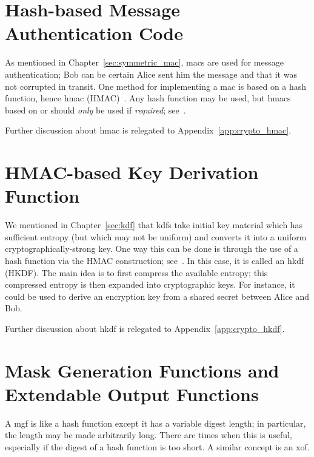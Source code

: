 


\section{Hash-based Message Authentication Code}
\label{sec:hash_hmac}

As mentioned in Chapter~\ref{sec:symmetric_mac},
\glspl{mac} are used for message authentication;
Bob can be certain Alice sent him the message and that it was not
corrupted in transit.
One method for implementing a \gls{mac} is based on a \gls{hash function},
hence \gls{hmac} (HMAC)~\cite{HMAC1996,rfc2104}.
Any \gls{hash function} may be used,
but \glspl{hmac} based on \MDFive{} or \ShaOne{} should \emph{only}
be used if \emph{required}; see~\cite{rfc6151}.

Further discussion about \gls{hmac} is relegated to
Appendix~\ref{app:crypto_hmac}.



\section{HMAC-based Key Derivation Function}
\label{sec:hash_hkdf}

We mentioned in Chapter~\ref{sec:kdf} that \glspl{kdf}
take initial key material which
has sufficient entropy (but which may not be uniform)
and converts it into a uniform cryptographically-strong key.
One way this can be done is through the use of a \gls{hash function}
via the HMAC construction; see~\cite{HKDF2010,rfc5869}.
In this case, it is called an \gls{hkdf} (HKDF).
The main idea is to first compress the available entropy;
this compressed entropy is then expanded into cryptographic keys.
For instance, it could be used to derive an encryption key
from a \gls{shared secret} between Alice and Bob.

Further discussion about \gls{hkdf} is relegated to
Appendix~\ref{app:crypto_hkdf}.



\section{Mask Generation Functions and Extendable Output Functions}
\label{sec:hash_mgf_xof}

A \gls{mgf} is like a \gls{hash function}
except it has a variable digest length;
in particular, the length may be made arbitrarily long.
There are times when this is useful, especially if the digest
of a \gls{hash function} is too short.
A similar concept is an \gls{xof}.

